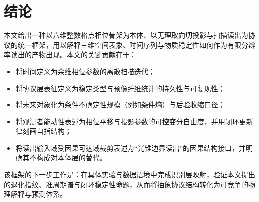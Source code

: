 \section{结论}

本文给出一种以六维整数格点相位骨架为本体、以无理取向切投影与扫描读出为协议的统一框架，用以解释三维空间表象、时间序列与物质稳定性如何作为有限分辨率读出的产物出现。本文的关键贡献在于：
\begin{itemize}
  \item 将时间定义为余维相位参数的离散扫描迭代；
  \item 将协议层表征定义为稳定类型与预像纤维统计的持久性与可复现性；
  \item 将未来对象化为条件不确定性规模（例如条件熵）与后验收缩口径；
  \item 将观测者能动性表述为相位平移与投影参数的可控变分自由度，并用闭环更新律刻画自指结构；
  \item 将读出输入域受因果可达域裁剪表述为“光锥边界读出”的因果结构接口，并明确其不构成对本体层的替代。
\end{itemize}

该框架的下一步工作是：在具体实验与数据语境中完成识别层映射，验证本文提出的退化指纹、准周期谱与闭环稳定性命题，从而将抽象协议结构转化为可竞争的物理解释与预测体系。

